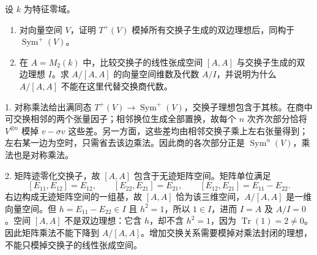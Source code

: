 \begin{exercise}\label{b4:ex:commutative-reflection-ideal}
	设 \(k\) 为特征零域。
	\begin{enumerate}
		\item 对向量空间 \(V\)，证明 \(T^+(V)\) 模掉所有交换子生成的双边理想后，同构于 \(\operatorname{Sym}^+(V)\)。
		\item 在 \(A=M_2(k)\) 中，比较交换子的线性张成空间 \([A,A]\) 与交换子生成的双边理想 \(I\)。求 \(A/[A,A]\) 的向量空间维数及代数 \(A/I\)，并说明为什么 \(A/[A,A]\) 不能在这里代替交换商代数。
	\end{enumerate}
\end{exercise}
\begin{solution}
	1. 对称乘法给出满同态 \(T^+(V)\to\operatorname{Sym}^+(V)\)，交换子理想包含于其核。在商中可交换相邻的两个张量因子；相邻换位生成全部置换，故每个 \(n\) 次齐次部分恰将 \(V^{\otimes n}\) 模掉 \(v-\sigma v\) 这些差。另一方面，这些差均由相邻交换子乘上左右张量得到；左右某一边为空时，只需省去该边乘法。因此商的各次部分正是 \(\operatorname{Sym}^n(V)\)，乘法也是对称乘法。

	2. 矩阵迹零化交换子，故 \([A,A]\) 包含于无迹矩阵空间。矩阵单位满足
	\[
		[E_{11},E_{12}]=E_{12},\qquad
		[E_{22},E_{21}]=E_{21},\qquad
		[E_{12},E_{21}]=E_{11}-E_{22}.
	\]
	右边构成无迹矩阵空间的一组基，故 \([A,A]\) 恰为该三维空间，\(A/[A,A]\) 是一维向量空间。但 \(h=E_{11}-E_{22}\in I\) 且 \(h^2=1\)，所以 \(1\in I\)，进而 \(I=A\) 及 \(A/I=0\)。空间 \([A,A]\) 不是双边理想：它含 \(h\)，却不含 \(h^2=1\)，因为 \(\operatorname{Tr}(1)=2\ne0\)。因此矩阵乘法不能下降到 \(A/[A,A]\)。增加交换关系需要模掉对乘法封闭的理想，不能只模掉交换子的线性张成空间。
\end{solution}

